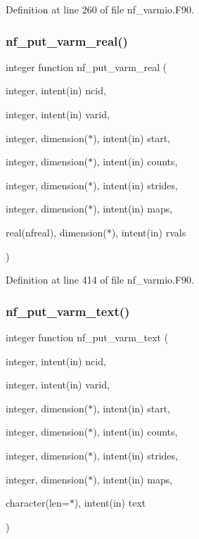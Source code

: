Definition at line 260 of file nf\+\_\+varmio.\+F90.

\mbox{\label{nf__varmio_8F90_ac19bae8717d854ced6a777ac9bc5ca60}} 
\subsubsection{\texorpdfstring{nf\+\_\+put\+\_\+varm\+\_\+real()}{nf\_put\_varm\_real()}}
{\footnotesize\ttfamily integer function nf\+\_\+put\+\_\+varm\+\_\+real (\begin{DoxyParamCaption}\item[{integer, intent(in)}]{ncid,  }\item[{integer, intent(in)}]{varid,  }\item[{integer, dimension($\ast$), intent(in)}]{start,  }\item[{integer, dimension($\ast$), intent(in)}]{counts,  }\item[{integer, dimension($\ast$), intent(in)}]{strides,  }\item[{integer, dimension($\ast$), intent(in)}]{maps,  }\item[{real(nfreal), dimension($\ast$), intent(in)}]{rvals }\end{DoxyParamCaption})}



Definition at line 414 of file nf\+\_\+varmio.\+F90.

\mbox{\label{nf__varmio_8F90_a0fc8d9bf654099e612f100cfbd5acbe2}} 
\subsubsection{\texorpdfstring{nf\+\_\+put\+\_\+varm\+\_\+text()}{nf\_put\_varm\_text()}}
{\footnotesize\ttfamily integer function nf\+\_\+put\+\_\+varm\+\_\+text (\begin{DoxyParamCaption}\item[{integer, intent(in)}]{ncid,  }\item[{integer, intent(in)}]{varid,  }\item[{integer, dimension($\ast$), intent(in)}]{start,  }\item[{integer, dimension($\ast$), intent(in)}]{counts,  }\item[{integer, dimension($\ast$), intent(in)}]{strides,  }\item[{integer, dimension($\ast$), intent(in)}]{maps,  }\item[{character(len=$\ast$), intent(in)}]{text }\end{DoxyParamCaption})}



